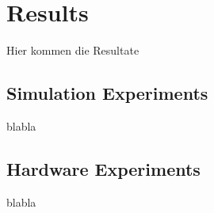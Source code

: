\chapter{Results}
\label{sec:results}

Hier kommen die Resultate
\section{Simulation Experiments}
blabla
\section{Hardware Experiments}
blabla